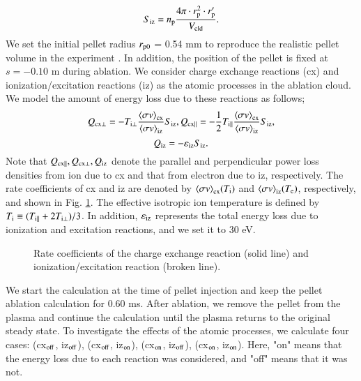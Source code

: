 \documentclass{jasse}%
\begin{document}
\begin{equation}
    S_{\rm{iz}} =  n_{\rm{p}}\frac{4\pi\cdot r^{\rm{2}}_{\rm{p}}\cdot r'_{\rm{p}}}{V_{\rm{cld}}}. 
\end{equation}
    We set the initial pellet radius $r_{\rm{p0}}$ = 0.54 mm to reproduce the realistic pellet volume in the experiment \cite{yoshikawa24}. In addition, the position of the pellet is fixed at $s = -0.10$ m during ablation. We consider charge exchange reactions (cx) and ionization/excitation reactions (iz) as the atomic processes in the ablation cloud. We model the amount of energy loss due to these reactions as follows;
\begin{equation}
    Q_{\rm{cx\bot}} = -T_{\rm{i\bot}}\frac{{\left\langle \sigma v\right\rangle}_{\rm{cx}}}
    {{\left\langle \sigma v\right\rangle}_{\rm{iz}}}S_{\rm{iz}},
    Q_{\rm{cx\parallel}} = -\frac{1}{2}T_{\rm{i\parallel}}\frac{{\left\langle \sigma v\right\rangle}_{\rm{cx}}}
    {{\left\langle \sigma v\right\rangle}_{\rm{iz}}}S_{\rm{iz}},
\end{equation}
\begin{equation}
    Q_{\rm{iz}} = -\varepsilon_{\rm{iz}}S_{\rm{iz}}.
\end{equation}
    Note that $Q_{\rm{cx\parallel}}, Q_{\rm{cx\bot}}, Q_{\rm{iz}}$ denote the parallel and perpendicular power loss densities from ion due to cx and that from electron due to iz, respectively. The rate coefficients of cx and iz are denoted by ${\left\langle \sigma v\right\rangle}_{\rm{cx}}(T_{\rm{i}})$ and ${\left\langle \sigma v\right\rangle}_{\rm{iz}}(T_{\rm{e}})$, respectively, and shown in Fig. \ref{fig_rate_coef}. The effective isotropic ion temperature is defined by $T_{\rm{i}} \equiv (T_{\rm{i\parallel}}+2T_{\rm{i\bot}})/3$. In addition, $\varepsilon_{\rm{iz}}$ represents the total energy loss due to ionization and excitation reactions, and we set it to 30 eV. 

\begin{figure}
    \centering
    
    \caption{Rate coefficients of the charge exchange reaction (solid line) and ionization/excitation reaction (broken line).} \label{fig_rate_coef}
\end{figure}

    We start the calculation at the time of pellet injection and keep the pellet ablation calculation for 0.60 ms. 
    After ablation, we remove the pellet from the plasma and continue the calculation until the plasma returns to the original steady state. To investigate the effects of the atomic processes, we calculate four cases: (cx$_{\rm{off}}$, iz$_{\rm{off}}$), (cx$_{\rm{off}}$, iz$_{\rm{on}}$), (cx$_{\rm{on}}$, iz$_{\rm{off}}$), (cx$_{\rm{on}}$, iz$_{\rm{on}}$). Here, "on" means that the energy loss due to each reaction was considered, and "off" means that it was not.
\end{document}
